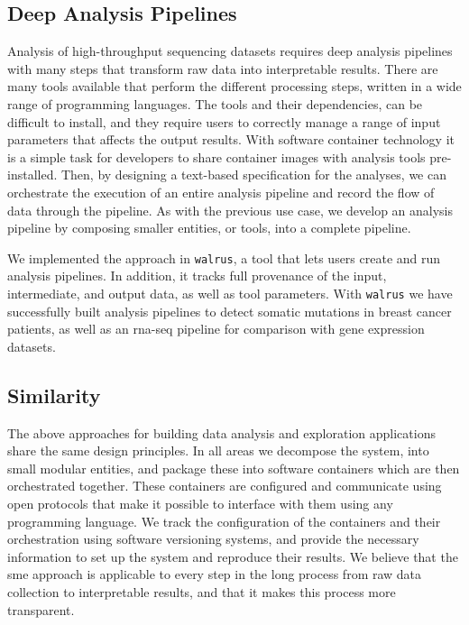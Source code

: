 \subsection{Deep Analysis Pipelines} 
Analysis of high-throughput sequencing datasets requires deep analysis pipelines
with many steps that transform raw data into interpretable
results.\cite{diao2015building} There are many tools available that
perform the different processing steps, written in a wide range of programming
languages. The tools and their dependencies, can be difficult to install, and
they require users to correctly manage a range of input parameters that affects
the output results. With software container technology it is a simple task for
developers to share container images with analysis tools pre-installed. Then, by
designing a text-based specification for the analyses, we can orchestrate the
execution of an entire analysis pipeline and record the flow of data through the
pipeline. As with the previous use case, we develop an analysis pipeline by
composing smaller entities, or tools, into a complete pipeline. 

We implemented the approach in \texttt{walrus}, a tool that lets users create
and run analysis pipelines. In addition, it tracks full provenance of the input,
intermediate, and output data, as well as tool parameters. With \texttt{walrus}
we have successfully built analysis pipelines to detect somatic mutations in
breast cancer patients, as well as an \gls{rna}-seq pipeline for comparison with
gene expression datasets. 

\subsection{Similarity} 
The above approaches for building data analysis and exploration applications
share the same design principles. In all areas we decompose the system, into
small modular entities, and package these into software containers which are
then orchestrated together. These containers are configured and communicate
using open protocols that make it possible to interface with them using any
programming language. We track the configuration of the containers and their
orchestration using software versioning systems, and provide the necessary
information to set up the system and reproduce their results.
We believe that the \gls{sme} approach is applicable to every step in the long
process from raw data collection to interpretable results, and that it makes
this process more transparent. 

